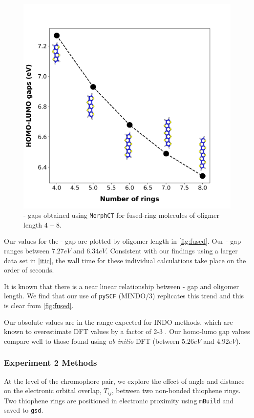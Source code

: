 \begin{figure}
  \center
  \includegraphics[width = .6\textwidth]{figures/fused-ring-figure.png}
  \caption{- gaps obtained using \texttt{MorphCT} for fused-ring molecules of oligmer length $4-8$.}
  \label{fig:fused}
\end{figure}

Our values for the - gap are plotted by oligomer length in \autoref{fig:fused}. 
Our - gap ranges between $7.27eV$ and $6.34eV$. Consistent with our findings using a larger data set
in \autoref{itic}, the wall time for these individual calculations take place on the order of seconds. 

It is known that there is a near linear
relationship between - gap and oligomer length. We find that our use of \texttt{pySCF} (MINDO/3) replicates
this trend and this is clear from \autoref{fig:fused}.

Our absolute values are in the range expected for INDO methods, which are known to overestimate DFT values by a factor of 2-3 \cite{Gorelsky2001}.
Our \gls{homo}-\gls{lumo} gap values compare well to those found using
\textit{ab initio} DFT (between $5.26eV$ and $4.92eV$)\cite{Arago2010}.

\subsubsection{Experiment 2 Methods}

At the level of the chromophore pair, we explore the effect of angle and distance on the electronic orbital
overlap, $T_{ij}$, between two non-bonded thiophene rings.
Two thiophene rings are positioned in electronic proximity using \texttt{mBuild} and saved to \texttt{gsd}. 

